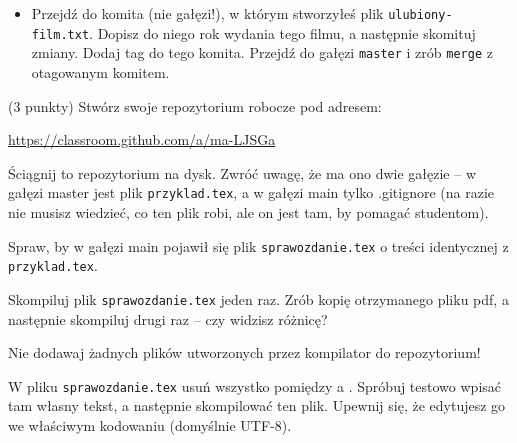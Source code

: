 \begin{zadanie}
\begin{itemize}
\item Przejdź do komita (nie gałęzi!), w którym stworzyłeś plik \verb+ulubiony-film.txt+. Dopisz do niego rok wydania tego filmu, a następnie skomituj zmiany. Dodaj tag do tego komita. Przejdź do gałęzi \verb+master+ i zrób \verb+merge+ z otagowanym komitem. 

\end{itemize}
\end{zadanie}

\begin{zadanie}{(3 punkty)} 
Stwórz swoje repozytorium robocze pod adresem:

\begin{center}
\url{https://classroom.github.com/a/ma-LJSGa}
\end{center}

Ściągnij to repozytorium na dysk. Zwróć uwagę, że ma ono dwie gałęzie -- w gałęzi master jest plik \verb+przyklad.tex+, a w gałęzi main tylko .gitignore (na razie nie musisz wiedzieć, co ten plik robi, ale on jest tam, by pomagać studentom).

Spraw, by w gałęzi main pojawił się plik \verb+sprawozdanie.tex+ o treści identycznej z \verb+przyklad.tex+.

Skompiluj plik \verb+sprawozdanie.tex+ jeden raz. Zrób kopię otrzymanego pliku pdf, a następnie skompiluj drugi raz -- czy widzisz różnicę?

Nie dodawaj żadnych plików utworzonych przez kompilator do repozytorium!

W pliku \verb+sprawozdanie.tex+  usuń wszystko pomiędzy \verb++ a \verb++. Spróbuj testowo wpisać tam własny tekst, a następnie skompilować ten plik. Upewnij się, że edytujesz go we właściwym kodowaniu (domyślnie UTF-8). 


\end{zadanie}
